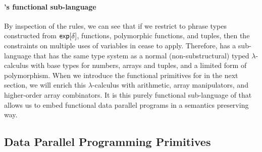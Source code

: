 \paragraph{\DPIA's functional sub-language} By inspection of the rules, we can see that if we restrict to phrase types constructed from $\mathsf{exp}[\delta]$, functions, polymorphic functions, and tuples, then the constraints on multiple uses of variables in \DPIA cease to apply. Therefore, \DPIA has a sub-language that has the same type system as a normal (non-substructural) typed $\lambda$-calculus with base types for numbers, arrays and tuples, and a limited form of polymorphism. When we introduce the functional primitives for \DPIA in the next section, we will enrich this $\lambda$-calculus with arithmetic, array manipulators, and higher-order array combinators. It is this purely functional sub-language of \DPIA that allows us to embed functional data parallel programs in a semantics preserving way.

\subsection{Data Parallel Programming Primitives}
\label{sec:dpia-prims}


